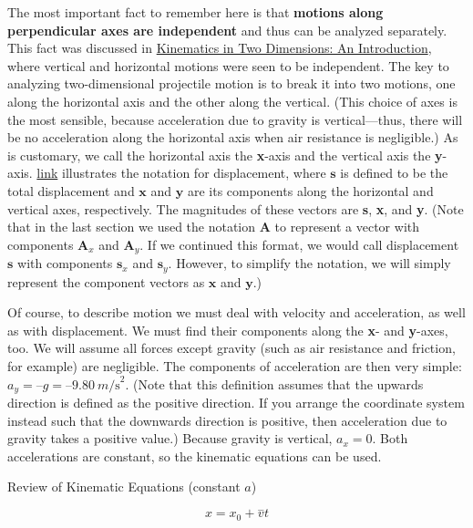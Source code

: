 \documentclass[
]{book}
\begin{document}
The most important fact to remember here is that \textbf{motions along
perpendicular axes are independent} and thus can be analyzed
separately. This fact was discussed in \href{/m54779}{Kinematics in Two Dimensions: An
Introduction}, where vertical and horizontal motions were seen
to be independent. The key to analyzing two-dimensional projectile
motion is to break it into two motions, one along the horizontal axis
and the other along the vertical. (This choice of axes is the most
sensible, because acceleration due to gravity is vertical---thus, there
will be no acceleration along the horizontal axis when air resistance is
negligible.) As is customary, we call the horizontal axis the \textbf{x}-axis
and the vertical axis the \textbf{y}-axis.
\protect\hyperlink{import-auto-id2242290}{link} illustrates the
notation for displacement, where \(\mathbf{s}{}\) is defined to be the
total displacement and \(\mathbf{x}{}\) and \(\mathbf{y}{}\) are its
components along the horizontal and vertical axes, respectively. The
magnitudes of these vectors are \textbf{s}, \textbf{x}, and \textbf{y}. (Note that in
the last section we used the notation \(\mathbf{A}{}\) to represent a
vector with components \(\mathbf{A}_{x}{}\) and \(\mathbf{A}_{y}{}\). If we
continued this format, we would call displacement \(\mathbf{s}{}\) with
components \(\mathbf{s}_{x}{}\) and \(\mathbf{s}_{y}{}\). However, to
simplify the notation, we will simply represent the component vectors as
\(\mathbf{x}{}\) and \(\mathbf{y}{}\).)

Of course, to describe motion we must deal with velocity and
acceleration, as well as with displacement. We must find their
components along the \textbf{x}- and \textbf{y}-axes, too. We will assume all
forces except gravity (such as air resistance and friction, for example)
are negligible. The components of acceleration are then very simple:
\({{a_{y} = –g} = –9.80\ m\text{/s}^{2}}{}\). (Note that this definition
assumes that the upwards direction is defined as the positive direction.
If you arrange the coordinate system instead such that the downwards
direction is positive, then acceleration due to gravity takes a positive
value.) Because gravity is vertical, \({a_{x} = 0}{}\). Both accelerations
are constant, so the kinematic equations can be used.

\hypertarget{fs-id1767845}{}
Review of Kinematic Equations (constant \(a\))

\leavevmode{}%
\[{{x =}x_{0}{+}\overset{-}{v}t}{}\]
\end{document}
